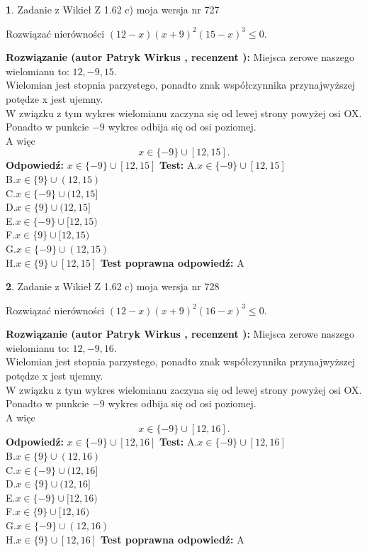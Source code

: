 \documentclass[12pt, a4paper]{article}
\theoremstyle{definition} %
\newtheorem{zad}{}
\newcommand{\zadStart}[1]{\begin{zad}#1\newline}
\newcommand{\zadStop}{\end{zad}}
\newcommand{\rozwStart}[2]{\noindent \textbf{Rozwiązanie (autor #1 , recenzent #2): }\newline}
\newcommand{\rozwStop}{\newline}
\newcommand{\odpStart}{\noindent \textbf{Odpowiedź:}\newline}
\newcommand{\odpStop}{\newline}
\newcommand{\testStart}{\noindent \textbf{Test:}\newline}
\newcommand{\testStop}{\newline}
\newcommand{\kluczStart}{\noindent \textbf{Test poprawna odpowiedź:}\newline}
\newcommand{\kluczStop}{\newline}
\begin{document}
\zadStart{Zadanie z Wikieł Z 1.62 c) moja wersja nr 727}

Rozwiązać nierówności $(12-x)(x+9)^{2}(15-x)^{3}\le0$.
\zadStop
\rozwStart{Patryk Wirkus}{}
Miejsca zerowe naszego wielomianu to: $12, -9, 15$.\\
Wielomian jest stopnia parzystego, ponadto znak współczynnika przy\linebreak najwyższej potędze x jest ujemny.\\ W związku z tym wykres wielomianu zaczyna się od lewej strony powyżej osi OX.\\
Ponadto w punkcie $-9$ wykres odbija się od osi poziomej.\\
A więc $$x \in \{-9\} \cup [12,15].$$
\rozwStop
\odpStart
$x \in \{-9\} \cup [12,15]$
\odpStop
\testStart
A.$x \in \{-9\} \cup [12,15]$\\
B.$x \in \{9\} \cup (12,15)$\\
C.$x \in \{-9\} \cup (12,15]$\\
D.$x \in \{9\} \cup (12,15]$\\
E.$x \in \{-9\} \cup [12,15)$\\
F.$x \in \{9\} \cup [12,15)$\\
G.$x \in \{-9\} \cup (12,15)$\\
H.$x \in \{9\} \cup [12,15]$
\testStop
\kluczStart
A
\kluczStop



\zadStart{Zadanie z Wikieł Z 1.62 c) moja wersja nr 728}

Rozwiązać nierówności $(12-x)(x+9)^{2}(16-x)^{3}\le0$.
\zadStop
\rozwStart{Patryk Wirkus}{}
Miejsca zerowe naszego wielomianu to: $12, -9, 16$.\\
Wielomian jest stopnia parzystego, ponadto znak współczynnika przy\linebreak najwyższej potędze x jest ujemny.\\ W związku z tym wykres wielomianu zaczyna się od lewej strony powyżej osi OX.\\
Ponadto w punkcie $-9$ wykres odbija się od osi poziomej.\\
A więc $$x \in \{-9\} \cup [12,16].$$
\rozwStop
\odpStart
$x \in \{-9\} \cup [12,16]$
\odpStop
\testStart
A.$x \in \{-9\} \cup [12,16]$\\
B.$x \in \{9\} \cup (12,16)$\\
C.$x \in \{-9\} \cup (12,16]$\\
D.$x \in \{9\} \cup (12,16]$\\
E.$x \in \{-9\} \cup [12,16)$\\
F.$x \in \{9\} \cup [12,16)$\\
G.$x \in \{-9\} \cup (12,16)$\\
H.$x \in \{9\} \cup [12,16]$
\testStop
\kluczStart
A
\kluczStop
\end{document}
